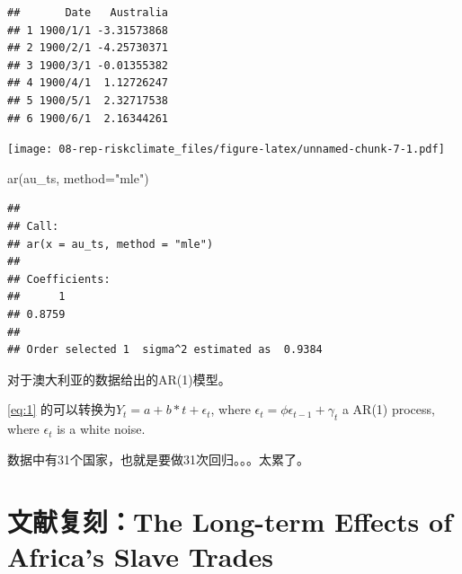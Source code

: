 \documentclass[
  oneside]{book}
\newenvironment{Shaded}{\begin{snugshade}}{\end{snugshade}}
\newcommand{\AttributeTok}[1]{\textcolor[rgb]{0.77,0.63,0.00}{#1}}
\newcommand{\DecValTok}[1]{\textcolor[rgb]{0.00,0.00,0.81}{#1}}
\newcommand{\FunctionTok}[1]{\textcolor[rgb]{0.00,0.00,0.00}{#1}}
\newcommand{\NormalTok}[1]{#1}
\newcommand{\OtherTok}[1]{\textcolor[rgb]{0.56,0.35,0.01}{#1}}
\newcommand{\SpecialCharTok}[1]{\textcolor[rgb]{0.00,0.00,0.00}{#1}}
\newcommand{\StringTok}[1]{\textcolor[rgb]{0.31,0.60,0.02}{#1}}
\begin{document}
\begin{verbatim}
##       Date   Australia
## 1 1900/1/1 -3.31573868
## 2 1900/2/1 -4.25730371
## 3 1900/3/1 -0.01355382
## 4 1900/4/1  1.12726247
## 5 1900/5/1  2.32717538
## 6 1900/6/1  2.16344261
\end{verbatim}

\begin{Shaded}
\end{Shaded}

\texttt{[image: 08-rep-riskclimate\_files/figure-latex/unnamed-chunk-7-1.pdf]}

\begin{Shaded}
\begin{Highlighting}[]
\FunctionTok{ar}\NormalTok{(au\_ts, }\AttributeTok{method=}\StringTok{"mle"}\NormalTok{)}
\end{Highlighting}
\end{Shaded}

\begin{verbatim}
## 
## Call:
## ar(x = au_ts, method = "mle")
## 
## Coefficients:
##      1  
## 0.8759  
## 
## Order selected 1  sigma^2 estimated as  0.9384
\end{verbatim}

对于澳大利亚的数据给出的AR(1)模型。

\ref{eq:1} 的可以转换为\(Y_t = a + b*t + \epsilon_t\), where \(\epsilon_t = \phi\epsilon_{t-1}+\gamma_t\) a AR(1) process, where \(\epsilon_t\) is a white noise.

数据中有31个国家，也就是要做31次回归。。。太累了。

\hypertarget{ux6587ux732eux590dux523bthe-long-term-effects-of-africas-slave-trades}{%
\chapter{文献复刻：The Long-term Effects of Africa's Slave Trades}\label{ux6587ux732eux590dux523bthe-long-term-effects-of-africas-slave-trades}}
\end{document}
